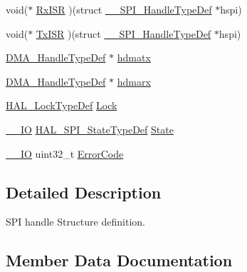 \begin{DoxyCompactItemize}
\item 
void($\ast$ \mbox{\hyperlink{struct_____s_p_i___handle_type_def_a599045b20d284f94e5a367a85cad9f39}{Rx\+I\+SR}} )(struct \mbox{\hyperlink{struct_____s_p_i___handle_type_def}{\+\_\+\+\_\+\+S\+P\+I\+\_\+\+Handle\+Type\+Def}} $\ast$hspi)
\item 
void($\ast$ \mbox{\hyperlink{struct_____s_p_i___handle_type_def_a4446bdc11698f861edf37b72cf437aeb}{Tx\+I\+SR}} )(struct \mbox{\hyperlink{struct_____s_p_i___handle_type_def}{\+\_\+\+\_\+\+S\+P\+I\+\_\+\+Handle\+Type\+Def}} $\ast$hspi)
\item 
\mbox{\hyperlink{group___d_m_a___exported___types_ga41b754a906b86bce54dc79938970138b}{D\+M\+A\+\_\+\+Handle\+Type\+Def}} $\ast$ \mbox{\hyperlink{struct_____s_p_i___handle_type_def_aa311e9419f520aee2d2fa30668ce485c}{hdmatx}}
\item 
\mbox{\hyperlink{group___d_m_a___exported___types_ga41b754a906b86bce54dc79938970138b}{D\+M\+A\+\_\+\+Handle\+Type\+Def}} $\ast$ \mbox{\hyperlink{struct_____s_p_i___handle_type_def_a0876a1b344524bbdbd984be1c3b07a10}{hdmarx}}
\item 
\mbox{\hyperlink{stm32f7xx__hal__def_8h_ab367482e943333a1299294eadaad284b}{H\+A\+L\+\_\+\+Lock\+Type\+Def}} \mbox{\hyperlink{struct_____s_p_i___handle_type_def_aa13d993a0b9b0ea6a07e5a77eeaf394e}{Lock}}
\item 
\mbox{\hyperlink{core__sc300_8h_aec43007d9998a0a0e01faede4133d6be}{\+\_\+\+\_\+\+IO}} \mbox{\hyperlink{group___s_p_i___exported___types_ga8891cb64e76198a860172d94c638c9b4}{H\+A\+L\+\_\+\+S\+P\+I\+\_\+\+State\+Type\+Def}} \mbox{\hyperlink{struct_____s_p_i___handle_type_def_aa3e13040cc9ea19050d21818bccd49c9}{State}}
\item 
\mbox{\hyperlink{core__sc300_8h_aec43007d9998a0a0e01faede4133d6be}{\+\_\+\+\_\+\+IO}} uint32\+\_\+t \mbox{\hyperlink{struct_____s_p_i___handle_type_def_ab2497f2e3cfae59376db75da3bda7ffe}{Error\+Code}}
\end{DoxyCompactItemize}


\subsection{Detailed Description}
S\+PI handle Structure definition. 

\subsection{Member Data Documentation}
\mbox{\label{struct_____s_p_i___handle_type_def_abef898bf323d7e9d693665f12b6f6239}} 
